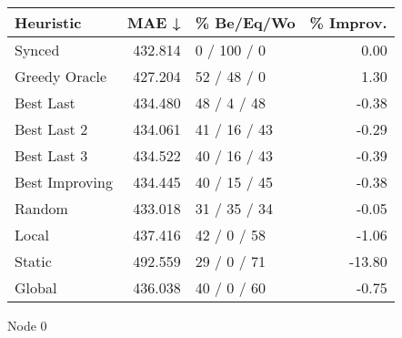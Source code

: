 \begin{tabular}{lrlr}
\toprule
\textbf{Heuristic} & \textbf{MAE ↓} & \textbf{\% Be/Eq/Wo} & \textbf{\% Improv.} \\
\midrule
            Synced &        432.814 &          0 / 100 / 0 &                0.00 \\
     Greedy Oracle &        427.204 &          52 / 48 / 0 &                1.30 \\
         Best Last &        434.480 &          48 / 4 / 48 &               -0.38 \\
       Best Last 2 &        434.061 &         41 / 16 / 43 &               -0.29 \\
       Best Last 3 &        434.522 &         40 / 16 / 43 &               -0.39 \\
    Best Improving &        434.445 &         40 / 15 / 45 &               -0.38 \\
            Random &        433.018 &         31 / 35 / 34 &               -0.05 \\
             Local &        437.416 &          42 / 0 / 58 &               -1.06 \\
            Static &        492.559 &          29 / 0 / 71 &              -13.80 \\
            Global &        436.038 &          40 / 0 / 60 &               -0.75 \\
\bottomrule
\end{tabular}
\caption{Node 0}
\label{tab:non_lr05_le2_bs4_0}
